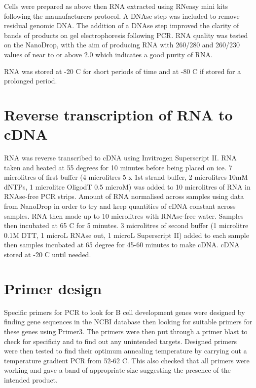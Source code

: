 Cells were prepared as above then RNA extracted using RNeasy mini kits following the maunufacturers protocol.
A DNAse step was included to remove residual genomic DNA.
The addition of a DNAse step improved the clarity of bands of products on gel electrophoresis following PCR.
RNA quality was tested on the NanoDrop, with the aim of producing RNA with 260/280 and 260/230 values of near to or above 2.0 which indicates a good purity of RNA.

RNA was stored at -20 \textdegree C for short periods of time and at -80 \textdegree C if stored for a prolonged period.


\section{Reverse transcription of RNA to cDNA}

RNA was reverse transcribed to cDNA using Invitrogen Superscript II.
RNA taken and heated at 55 degrees for 10 minutes before being placed on ice.
7 microlitres of first buffer (4 microlitres 5 x 1st strand buffer, 2 microlitres 10mM dNTPs, 1 microlitre OligodT 0.5 microM) was added to 10 microlitres of RNA in RNAse-free PCR strips.
Amount of RNA normalised across samples using data from NanoDrop in order to try and keep quantities of cDNA constant across samples.
RNA then made up to 10 microlitres with RNAse-free water.
Samples then incubated at 65 \textdegree C for 5 minutes.
3 microlitres of second buffer (1 microlitre 0.1M DTT, 1 microL RNAse out, 1 microL Superscript II) added to each sample then samples incubated at 65 degree for 45-60 minutes to make cDNA.
cDNA stored at -20 \textdegree C until needed.

\section{Primer design}

Specific primers for PCR to look for B cell development genes were designed by finding gene sequences in the NCBI database then looking for suitable primers for these genes using Primer3.
The primers were then put through a primer blast to check for specificiy and to find out any unintended targets.
Designed primers were then tested to find their optimum annealing temperature by carrying out a temperature gradient PCR from 52-62 \textdegree C.
This also checked that all primers were working and gave a band of appropriate size suggesting the presence of the intended product.

